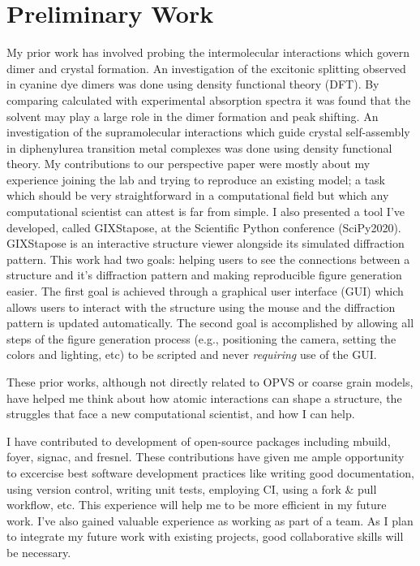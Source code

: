\section*{Preliminary Work}
My prior work has involved probing the intermolecular interactions which govern dimer and crystal formation.
An investigation of the excitonic splitting observed in cyanine dye dimers was done using density functional theory (DFT)\cite{Fothergill2018}.
By comparing calculated with experimental absorption spectra it was found that the solvent may play a large role in the dimer formation and peak shifting.
An investigation of the supramolecular interactions which guide crystal self-assembly in diphenylurea transition metal complexes was done using density functional theory\cite{Millard2019a}. 
My contributions to our perspective paper were mostly about my experience joining the lab and trying to reproduce an existing model; a task which should be very straightforward in a computational field but which any computational scientist can attest is far from simple\cite{Jankowski2019}. 
I also presented a tool I've developed, called GIXStapose, at the Scientific Python conference (SciPy2020). %
GIXStapose is an interactive structure viewer alongside its simulated diffraction pattern.
This work had two goals: helping users to see the connections between a structure and it's diffraction pattern and making reproducible figure generation easier.
The first goal is achieved through a graphical user interface (GUI) which allows users to interact with the structure using the mouse and the diffraction pattern is updated automatically.
The second goal is accomplished by allowing all steps of the figure generation process (e.g., positioning the camera, setting the colors and lighting, etc) to be scripted and never \textit{requiring} use of the GUI.

These prior works, although not directly related to OPVS or coarse grain models, have helped me think about how atomic interactions can shape a structure, the struggles that face a new computational scientist, and how I can help.

I have contributed to development of open-source packages including mbuild, foyer, signac, and fresnel. %
These contributions have given me ample opportunity to excercise best software development practices like writing good documentation, using version control, writing unit tests, employing CI, using a fork \& pull workflow, etc.
This experience will help me to be more efficient in my future work.
I've also gained valuable experience as working as part of a team.
As I plan to integrate my future work with existing projects, good collaborative skills will be necessary.

